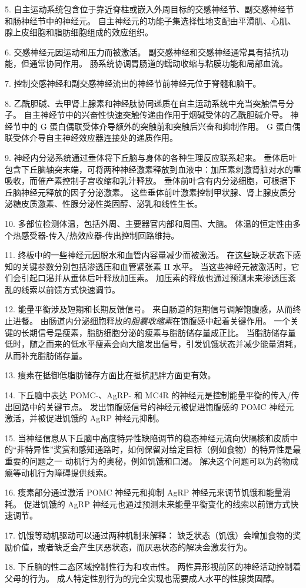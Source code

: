 5. 自主运动系统包含位于靠近脊柱或嵌入外周目标的交感神经节、副交感神经节和肠神经节中的神经元。
自主神经元的功能子集选择性地支配由平滑肌、心肌、腺上皮细胞和脂肪细胞组成的效应组织。


6. 交感神经元因运动和压力而被激活。
副交感神经和交感神经通常具有拮抗功能，但通常协同作用。
肠系统协调胃肠道的蠕动收缩与粘膜功能和局部血流。


7. 控制交感神经和副交感神经流出的神经节前神经元位于脊髓和脑干。


8. 乙酰胆碱、去甲肾上腺素和神经肽协同递质在自主运动系统中充当突触信号分子。
自主神经节中的兴奋性快速突触传递由作用于烟碱受体的乙酰胆碱介导。
神经节中的 G 蛋白偶联受体介导额外的突触前和突触后兴奋和抑制作用。
G 蛋白偶联受体介导自主神经效应器连接处的递质作用。 


9. 神经内分泌系统通过垂体将下丘脑与身体的各种生理反应联系起来。
垂体后叶包含下丘脑轴突末端，可将两种神经激素释放到血液中：加压素刺激肾脏对水的重吸收，而催产素控制子宫收缩和乳汁释放。
垂体前叶含有内分泌细胞，可根据下丘脑神经元释放的因子分泌激素。
这些垂体前叶激素控制甲状腺、肾上腺皮质分泌糖皮质激素、性腺分泌性类固醇、泌乳和线性生长。


10. 多部位检测体温，包括外周、主要器官内部和周围、大脑。
体温的恒定性由多个热感受器-传入/热效应器-传出控制回路维持。


11. 终板中的一些神经元因脱水和血管内容量减少而被激活。
在这些缺乏状态下感知的关键参数分别包括渗透压和血管紧张素 II 水平。
当这些神经元被激活时，它们会引起口渴并从垂体后叶释放加压素。
加压素的释放也通过预测未来渗透压紊乱的线索以前馈方式快速调节。 


12. 能量平衡涉及短期和长期反馈信号。
来自肠道的短期信号调解饱腹感，从而终止进餐。
由肠道内分泌细胞释放的\textit{胆囊收缩素}在饱腹感中起着关键作用。
一个关键的长期信号是瘦素，脂肪细胞分泌的瘦素与脂肪储存量成正比。
当脂肪储存量低时，随之而来的低水平瘦素会向大脑发出信号，引发饥饿状态并减少能量消耗，从而补充脂肪储存量。 


13. 瘦素在抵御低脂肪储存方面比在抵抗肥胖方面更有效。 


14. 下丘脑中表达 POMC-、AgRP- 和 MC4R 的神经元是控制能量平衡的传入/传出回路中的关键节点。
发出饱腹感信号的神经元被促进饱腹感的 POMC 神经元激活，并被促进饥饿的 AgRP 神经元抑制。


15. 当神经信息从下丘脑中高度特异性缺陷调节的稳态神经元流向伏隔核和皮质中的“非特异性”奖赏和感知通路时，如何保留对给定目标（例如食物）的特异性是最重要的问题之一 动机行为的奥秘，例如饥饿和口渴。
解决这个问题可以为药物成瘾等动机行为障碍提供线索。 


16. 瘦素部分通过激活 POMC 神经元和抑制 AgRP 神经元来调节饥饿和能量消耗。
促进饥饿的 AgRP 神经元也通过预测未来能量平衡变化的线索以前馈方式快速调节。


17. 饥饿等动机驱动可以通过两种机制来解释：
缺乏状态（饥饿）会增加食物的奖励价值，或者缺乏会产生厌恶状态，而厌恶状态的解决会激发行为。 


18. 下丘脑的性二态区域控制性行为和攻击性。
两性异形视前区的神经活动控制着父母的行为。
成人特定性别行为的完全实现也需要成人水平的性腺类固醇。

